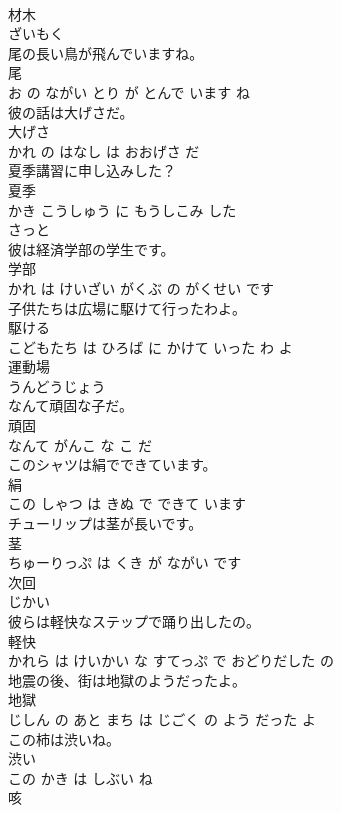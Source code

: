 \documentclass[8pt]{extreport}
\begin{document}
\begin{CJK}{UTF8}{min}
\\	材木	
\\	ざいもく		
\\	尾の長い鳥が飛んでいますね。	
\\	尾 
\\	お の ながい とり が とんで います ね			
\\	彼の話は大げさだ。	
\\	大げさ 
\\	かれ の はなし は おおげさ だ			
\\	夏季講習に申し込みした？	
\\	夏季 
\\	かき こうしゅう に もうしこみ した 
\\	さっと	
\\	彼は経済学部の学生です。	
\\	学部 
\\	かれ は けいざい がくぶ の がくせい です			
\\	子供たちは広場に駆けて行ったわよ。	
\\	駆ける 
\\	こどもたち は ひろば に かけて いった わ よ			
\\	運動場	
\\	うんどうじょう		
\\	なんて頑固な子だ。	
\\	頑固 
\\	なんて がんこ な こ だ			
\\	このシャツは絹でできています。	
\\	絹 
\\	この しゃつ は きぬ で できて います			
\\	チューリップは茎が長いです。	
\\	茎 
\\	ちゅーりっぷ は くき が ながい です			
\\	次回	
\\	じかい		
\\	彼らは軽快なステップで踊り出したの。	
\\	軽快 
\\	かれら は けいかい な すてっぷ で おどりだした の			
\\	地震の後、街は地獄のようだったよ。	
\\	地獄 
\\	じしん の あと まち は じごく の よう だった よ			
\\	この柿は渋いね。	
\\	渋い 
\\	この かき は しぶい ね			
\\	咳	

\end{CJK}
\end{document}
